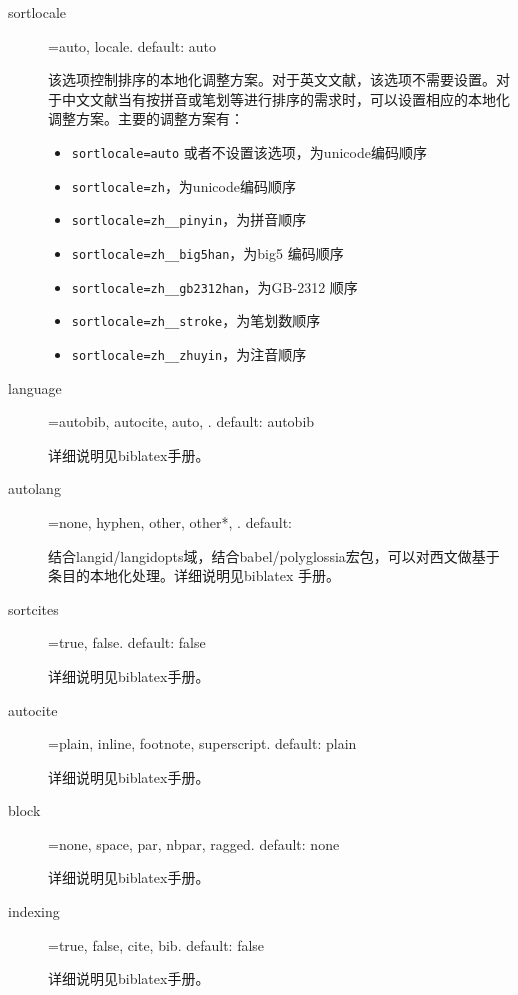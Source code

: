\begin{description}
  \item[sortlocale]=auto, locale. \hfill default: auto

  该选项控制排序的本地化调整方案。对于英文文献，该选项不需要设置。对于中文文献当有按拼音或笔划等进行排序的需求时，可以设置相应的本地化调整方案。主要的调整方案有：
  \begin{itemize}
    \item \verb|sortlocale=auto| 或者不设置该选项，为unicode编码顺序
    \item \verb|sortlocale=zh|，为unicode编码顺序
    \item \verb|sortlocale=zh__pinyin|，为拼音顺序
    \item \verb|sortlocale=zh__big5han|，为big5 编码顺序
    \item \verb|sortlocale=zh__gb2312han|，为GB-2312 顺序
    \item \verb|sortlocale=zh__stroke|，为笔划数顺序
    \item \verb|sortlocale=zh__zhuyin|，为注音顺序
  \end{itemize}
  
  \item[language]=autobib, autocite, auto, . \hfill default: autobib

  详细说明见biblatex手册。
  
  \item[autolang]=none, hyphen, other, other*, . \hfill default:

  结合langid/langidopts域，结合babel/polyglossia宏包，可以对西文做基于条目的本地化处理。详细说明见biblatex 手册。
  
  \item[sortcites]=true, false. \hfill default: false

  详细说明见biblatex手册。
  
  \item[autocite]=plain, inline, footnote, superscript. \hfill default: plain

  详细说明见biblatex手册。
  
  \item[block]=none, space, par, nbpar, ragged. \hfill default: none

  详细说明见biblatex手册。
  
  \item[indexing]=true, false, cite, bib. \hfill default: false

  详细说明见biblatex手册。


\end{description}
